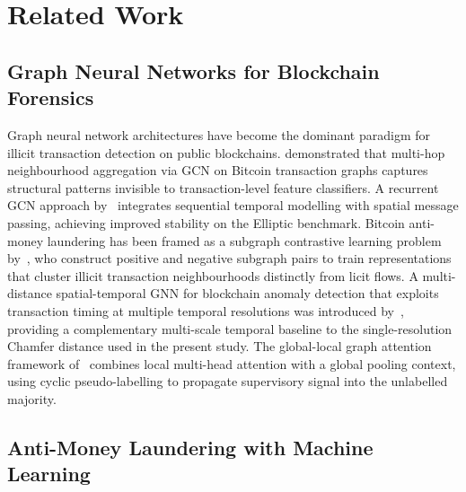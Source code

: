 \documentclass[12pt,a4paper]{article}
\begin{document}
\section{Related Work}
\label{sec:related}

\subsection{Graph Neural Networks for Blockchain Forensics}

Graph neural network architectures have become the dominant
paradigm for illicit transaction detection on public
blockchains. \citet{asiri2025} demonstrated that multi-hop
neighbourhood aggregation via GCN on Bitcoin transaction
graphs captures structural patterns invisible to
transaction-level feature classifiers. A recurrent GCN
approach by~\citet{alarab2024} integrates sequential temporal
modelling with spatial message passing, achieving improved
stability on the Elliptic benchmark. Bitcoin anti-money
laundering has been framed as a subgraph contrastive learning
problem by~\citet{ouyang2024btc}, who construct positive
and negative subgraph pairs to train representations that
cluster illicit transaction neighbourhoods distinctly from
licit flows. A multi-distance spatial-temporal GNN for
blockchain anomaly detection that exploits transaction timing
at multiple temporal resolutions was introduced
by~\citet{chen2025multi}, providing a complementary
multi-scale temporal baseline to the single-resolution
Chamfer distance used in the present study. The global-local
graph attention framework of~\citet{globalloc2025} combines
local multi-head attention with a global pooling context,
using cyclic pseudo-labelling to propagate supervisory signal
into the unlabelled majority.

\subsection{Anti-Money Laundering with Machine Learning}
\end{document}

